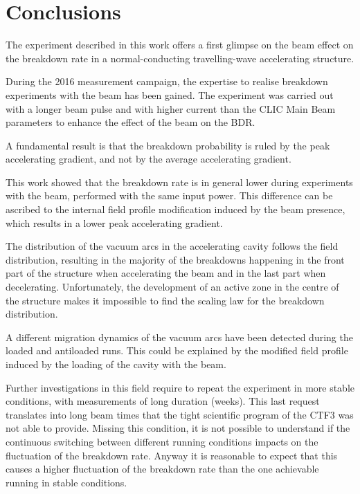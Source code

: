\newpage
\section{Conclusions}

The experiment described in this work offers a first glimpse on the beam effect on the breakdown rate in a normal-conducting travelling-wave accelerating structure.

During the 2016 measurement campaign, the expertise to realise breakdown experiments with the beam has been gained. The experiment was carried out with a longer beam pulse and with higher current than the CLIC Main Beam parameters to enhance the effect of the beam on the BDR.

A fundamental result is that the breakdown probability is ruled by the peak accelerating gradient, and not by the average accelerating gradient.

This work showed that the breakdown rate is in general lower during experiments with the beam, performed with the same input power. This difference can be ascribed to the internal field profile modification induced by the beam presence, which results in a lower peak accelerating gradient.

The distribution of the vacuum arcs in the accelerating cavity follows the field distribution, resulting in the majority of the breakdowns happening in the front part of the structure when accelerating the beam and in the last part when decelerating. Unfortunately, the development of an active zone in the centre of the structure makes it impossible to find the scaling law for the breakdown distribution. 

A different migration dynamics of the vacuum arcs have been detected during the loaded and antiloaded runs. This could be explained by the modified field profile induced by the loading of the cavity with the beam.

Further investigations in this field require to repeat the experiment in more stable conditions, with measurements of long duration (weeks). This last request translates into long beam times that the tight scientific program of the CTF3 was not able to provide. Missing this condition, it is not possible to understand if the continuous switching between different running conditions impacts on the fluctuation of the breakdown rate. Anyway it is reasonable to expect that this causes a higher fluctuation of the breakdown rate than the one achievable running in stable conditions. 

